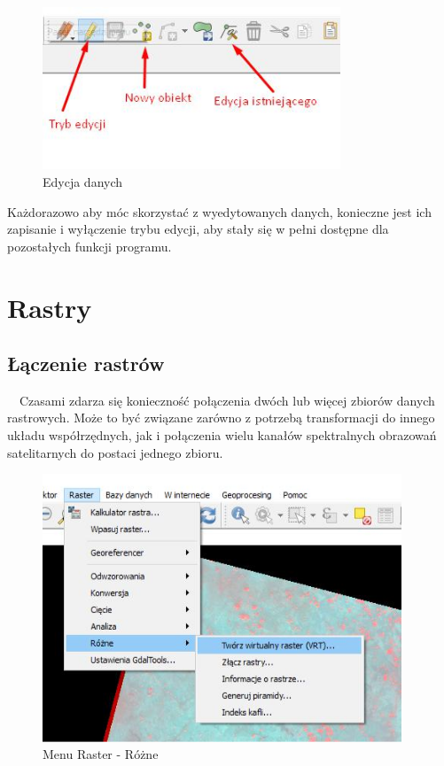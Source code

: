 \documentclass[12pt,a4paper]{book}
\begin{document}
\begin{center}
\begin{figure}
\includegraphics[width=8.901cm,height=4.851cm]{003-edycja.jpg}
\caption{Edycja danych}
\end{figure}
\end{center}
Każdorazowo aby móc skorzystać z wyedytowanych danych, konieczne jest ich zapisanie i wyłączenie trybu edycji, aby stały się w pełni dostępne dla pozostałych funkcji programu.


\chapter{Rastry}
\section{Łączenie rastrów}
\ \ Czasami zdarza się konieczność połączenia dwóch lub więcej zbiorów danych rastrowych. Może to być związane zarówno z potrzebą transformacji do innego układu współrzędnych, jak i połączenia wielu kanałów spektralnych obrazowań satelitarnych do postaci jednego zbioru.
\begin{figure}[!ht]
	\centering
	\includegraphics[height=8cm]{004-raster-rozne.jpg}
	\caption{Menu Raster - Różne}
\end{figure}
\end{document}
